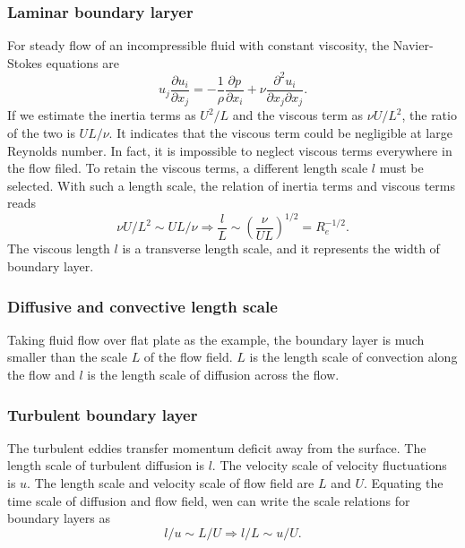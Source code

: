 \documentclass[review]{elsarticle}
\begin{document}
		\subsubsection{Laminar boundary laryer}
			For steady flow of an incompressible fluid with constant viscosity, the Navier-Stokes equations are
			\begin{equation}\label{NS1}
				u_j\frac{\partial u_i}{\partial x_j} = -\frac{1}{\rho}\frac{\partial p}{\partial x_i} 
					+ \nu \frac{\partial ^2u_i}{\partial x_j\partial x_j}.			
			\end{equation}
			If we estimate the inertia terms as $U^2/L$ and the viscous term as $\nu U/L^2$, the ratio of the two 
			is $UL/\nu$. It indicates that the viscous term could be negligible at large Reynolds number. In fact, 
			it is impossible to neglect viscous terms everywhere in the flow filed. To retain the viscous terms, a 
			different length scale $l$ must be selected. With such a length scale, the relation of inertia terms and 
			viscous terms reads
			\begin{equation}
				\nu U/L^2 \sim UL/\nu \Rightarrow \frac{l}{L} \sim \left( \frac{\nu}{UL}\right)^{1/2}=R^{-1/2}_e. 
			\end{equation}
			The viscous length $l$ is a transverse length scale, and it represents the width of boundary layer.
		\subsubsection{Diffusive and convective length scale}
			Taking fluid flow over flat plate as the example, the boundary layer is much smaller than the scale $L$ 
			of the flow field. $L$ is the length scale of convection along the flow and $l$ is the length scale of 
			diffusion across the flow. 
		\subsubsection{Turbulent boundary layer}
			The turbulent eddies transfer momentum deficit away from the surface. The length scale of turbulent diffusion 
			is $l$. The velocity scale of velocity fluctuations is $u$. The length scale and velocity scale of flow field 
			are $L$ and $U$. Equating the time scale of diffusion and flow field, wen can write the scale relations for 
			boundary layers as
			\begin{equation}
				l/u \sim L/U \Rightarrow l/L \sim u/U.
			\end{equation}
			\begin{center}
			\end{center}
						
\end{document}
